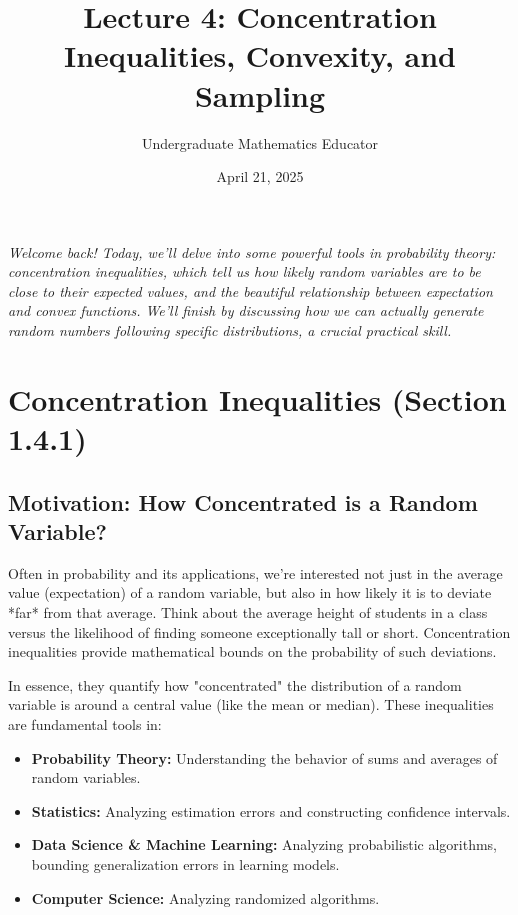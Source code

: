 \documentclass[11pt]{article}
\theoremstyle{definition}
\theoremstyle{remark}
\begin{document}
\title{Lecture 4: Concentration Inequalities, Convexity, and Sampling}
\author{Undergraduate Mathematics Educator} 
\date{April 21, 2025} %
\maketitle

\begin{center}
    \textit{Welcome back! Today, we'll delve into some powerful tools in probability theory: concentration inequalities, which tell us how likely random variables are to be close to their expected values, and the beautiful relationship between expectation and convex functions. We'll finish by discussing how we can actually generate random numbers following specific distributions, a crucial practical skill.}
\end{center}

\section{Concentration Inequalities (Section 1.4.1)}

\subsection{Motivation: How Concentrated is a Random Variable?}

Often in probability and its applications, we're interested not just in the average value (expectation) of a random variable, but also in how likely it is to deviate *far* from that average. Think about the average height of students in a class versus the likelihood of finding someone exceptionally tall or short. Concentration inequalities provide mathematical bounds on the probability of such deviations.

In essence, they quantify how "concentrated" the distribution of a random variable is around a central value (like the mean or median). These inequalities are fundamental tools in:
\begin{itemize}
    \item \textbf{Probability Theory:} Understanding the behavior of sums and averages of random variables.
    \item \textbf{Statistics:} Analyzing estimation errors and constructing confidence intervals.
    \item \textbf{Data Science \& Machine Learning:} Analyzing probabilistic algorithms, bounding generalization errors in learning models.
    \item \textbf{Computer Science:} Analyzing randomized algorithms.
\end{itemize}
\end{document}

